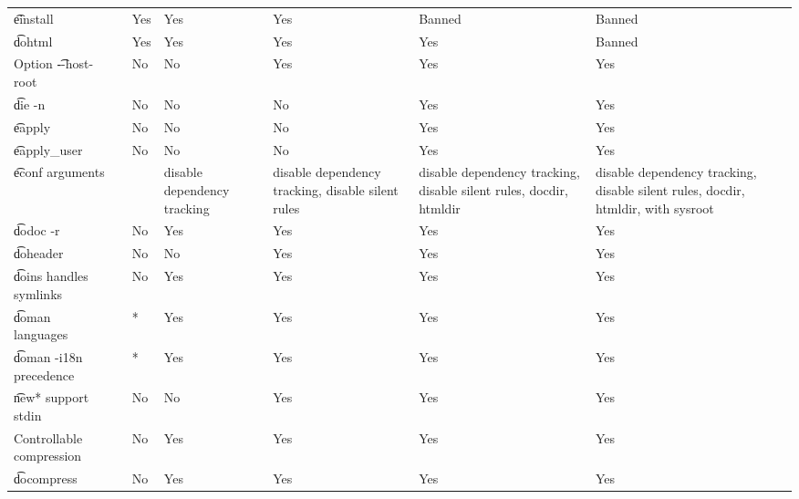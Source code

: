 \begin{landscape}
\begin{longtable}{llP{7.5em}P{7.5em}P{7.5em}P{7.5em}P{7.5em}}
\t{einstall} &  &
    Yes & Yes & Yes & Banned & Banned \\

\t{dohtml} &  &
    Yes & Yes & Yes & Yes & Banned \\

Option \t{-{}-host-root} &  &
    No & No & Yes & Yes & Yes \\

\t{die -n} &  &
    No & No & No & Yes & Yes \\

\t{eapply} &  &
    No & No & No & Yes & Yes \\

\t{eapply_user} &  &
    No & No & No & Yes & Yes \\

\t{econf} arguments &  &
    & disable dependency tracking &
    disable dependency tracking, disable silent rules &
    disable dependency tracking, disable silent rules, docdir, htmldir &
    disable dependency tracking, disable silent rules, docdir, htmldir, with sysroot \\

\t{dodoc -r} &  &
    No & Yes & Yes & Yes & Yes \\

\t{doheader} &  &
    No & No & Yes & Yes & Yes \\

\t{doins} handles symlinks &  &
    No & Yes & Yes & Yes & Yes \\

\t{doman} languages &  &
    * & Yes & Yes & Yes & Yes \\

\t{doman -i18n} precedence &  &
    * & Yes & Yes & Yes & Yes \\

\t{new*} support stdin &  &
    No & No & Yes & Yes & Yes \\

Controllable compression &  &
    No & Yes & Yes & Yes & Yes \\

\t{docompress} &  &
    No & Yes & Yes & Yes & Yes \\


\end{longtable}
\end{landscape}
